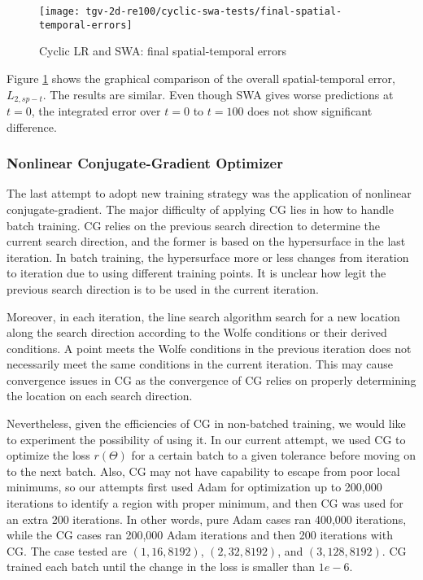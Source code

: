 \begin{figure}[hbt!]
    \centering%
    \texttt{[image: tgv-2d-re100/cyclic-swa-tests/final-spatial-temporal-errors]}%
    \caption[%
        Cyclic LR and SWA: final spatial-temporal errors%
    ]{%
        Cyclic LR and SWA: final spatial-temporal errors%
    }\label{fig:cyclic-swa-tests-final-sterrs}%
\end{figure}

Figure \ref{fig:cyclic-swa-tests-final-sterrs} shows the graphical comparison of the overall spatial-temporal error, $L_{2,sp-t}$.
The results are similar.
Even though SWA gives worse predictions at $t=0$, the integrated error over $t=0$ to $t=100$ does not show significant difference.

\subsubsection{Nonlinear Conjugate-Gradient Optimizer}

The last attempt to adopt new training strategy was the application of nonlinear conjugate-gradient.
The major difficulty of applying CG lies in how to handle batch training.
CG relies on the previous search direction to determine the current search direction, and the former is based on the hypersurface in the last iteration.
In batch training, the hypersurface more or less changes from iteration to iteration due to using different training points.
It is unclear how legit the previous search direction is to be used in the current iteration.

Moreover, in each iteration, the line search algorithm search for a new location along the search direction according to the Wolfe conditions or their derived conditions.
A point meets the Wolfe conditions in the previous iteration does not necessarily meet the same conditions in the current iteration.
This may cause convergence issues in CG as the convergence of CG relies on properly determining the location on each search direction.

Nevertheless, given the efficiencies of CG in non-batched training, we would like to experiment the possibility of using it.
In our current attempt, we used CG to optimize the loss $r(\Theta)$ for a certain batch to a given tolerance before moving on to the next batch.
Also, CG may not have capability to escape from poor local minimums, so our attempts first used Adam for optimization up to 200,000 iterations to identify a region with proper minimum, and then CG was used for an extra 200 iterations.
In other words, pure Adam cases ran 400,000 iterations, while the CG cases ran 200,000 Adam iterations and then 200 iterations with CG.
The case tested are $(1, 16, 8192)$, $(2, 32, 8192)$, and $(3, 128, 8192)$.
CG trained each batch until the change in the loss is smaller than $1e-6$.

